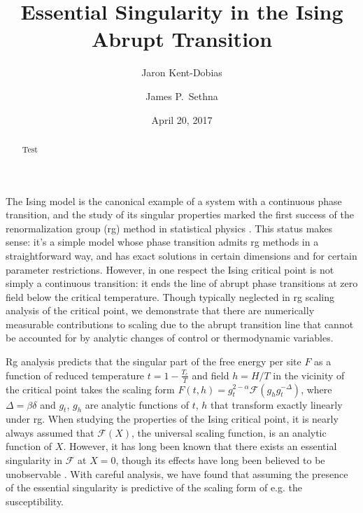 \documentclass[aps,prl,reprint,fleqn]{revtex4-1}
\begin{document}
\title{Essential Singularity in the Ising Abrupt Transition}
\author{Jaron Kent-Dobias}
\author{James P.~Sethna}

\date{April 20, 2017}

\begin{abstract}
  Test
\end{abstract}

\maketitle

The Ising model is the canonical example of a system with a continuous phase
transition, and the study of its singular properties marked the first success
of the renormalization group ({\sc rg}) method in statistical physics
\cite{wilson.1971.renormalization}. This status makes sense: it's a simple
model whose phase transition admits {\sc rg} methods in a straightforward way,
and has exact solutions in certain dimensions and for certain parameter
restrictions. However, in one respect the Ising critical point is not simply a
continuous transition: it ends the line of abrupt phase transitions at zero
field below the critical temperature. Though typically neglected in {\sc rg}
scaling analysis of the critical point, we demonstrate that there are
numerically measurable contributions to scaling due to the abrupt transition
line that cannot be accounted for by analytic changes of control or
thermodynamic variables.

{\sc Rg} analysis predicts that the singular part of the free energy per site
$F$ as a function of reduced temperature $t=1-\frac{T_c}T$ and field $h=H/T$ in the vicinity of the critical point takes the scaling form
$F(t,h)=g_t^{2-\alpha}\mathcal F(g_hg_t^{-\Delta})$, where
$\Delta=\beta\delta$ and $g_t$, $g_h$ are analytic functions of $t$, $h$ that
transform exactly linearly under {\sc rg}. When studying the properties of the
Ising critical point, it is nearly always assumed that $\mathcal F(X)$, the
universal scaling function, is an analytic function of $X$. However, it has
long been known that there exists an essential singularity in $\mathcal F$ at
$X=0$, though its effects have long been believed to be unobservable
\cite{fisher.1967.condensation}. With careful analysis, we have found that
assuming the presence of the essential singularity is predictive of the
scaling form of e.g. the susceptibility.
\end{document}
